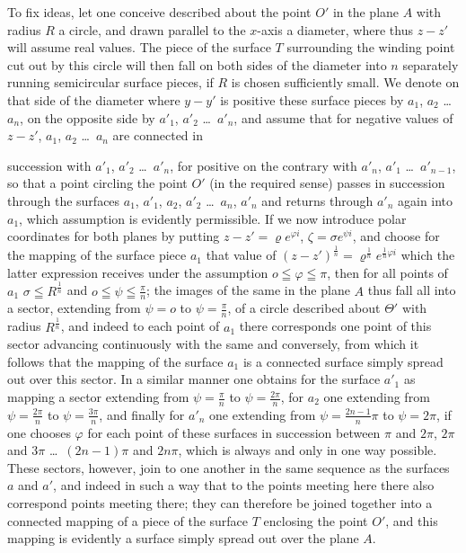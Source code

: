 \documentclass{article}
\begin{document}
To fix ideas, let one conceive described about the point $O'$ in the plane $A$ with radius $R$ a circle, and drawn parallel to the $x$-axis a diameter, where thus $z - z'$ will assume real values. The piece of the surface $T$ surrounding the winding point cut out by this circle will then fall on both sides of the diameter into $n$ separately running semicircular surface pieces, if $R$ is chosen sufficiently small. We denote on that side of the diameter where $y - y'$ is positive these surface pieces by $a_1$, $a_2$ \dots\ $a_n$, on the opposite side by $a'_1$, $a'_2$ \dots\ $a'_n$, and assume that for negative values of $z - z'$, $a_1$, $a_2$ \dots\ $a_n$ are connected in

succession with $a'_1$, $a'_2$ \dots\ $a'_n$, for positive on the contrary with $a'_n$, $a'_1$ \dots\ $a'_{n-1}$, so that a point circling the point $O'$ (in the required sense) passes in succession through the surfaces $a_1$, $a'_1$, $a_2$, $a'_2$ \dots\ $a_n$, $a'_n$ and returns through $a'_n$ again into $a_1$, which assumption is evidently permissible. If we now introduce polar coordinates for both planes by putting $z - z' = \varrho e^{\varphi i}$, $\zeta = \sigma e^{\psi i}$, and choose for the mapping of the surface piece $a_1$ that value of $(z - z')^{\frac{1}{n}} = \varrho^{\frac{1}{n}} e^{\frac{1}{n}\varphi i}$ which the latter expression receives under the assumption $o \leqq \varphi \leqq \pi$, then for all points of $a_1$ $\sigma \leqq R^{\frac{1}{n}}$ and $o \leqq \psi \leqq \frac{\pi}{n}$; the images of the same in the plane $A$ thus fall all into a sector, extending from $\psi = o$ to $\psi = \frac{\pi}{n}$, of a circle described about $\varTheta'$ with radius $R^{\frac{1}{n}}$, and indeed to each point of $a_1$ there corresponds one point of this sector advancing continuously with the same and conversely, from which it follows that the mapping of the surface $a_1$ is a connected surface simply spread out over this sector. In a similar manner one obtains for the surface $a'_1$ as mapping a sector extending from $\psi = \frac{\pi}{n}$ to $\psi = \frac{2\pi}{n}$, for $a_2$ one extending from $\psi = \frac{2\pi}{n}$ to $\psi = \frac{3\pi}{n}$, and finally for $a'_n$ one extending from $\psi = \frac{2n - 1}{n}\pi$ to $\psi = 2\pi$, if one chooses $\varphi$ for each point of these surfaces in succession between $\pi$ and $2\pi$, $2\pi$ and $3\pi$ \dots\ $(2n-1)\pi$ and $2n\pi$, which is always and only in one way possible. These sectors, however, join to one another in the same sequence as the surfaces $a$ and $a'$, and indeed in such a way that to the points meeting here there also correspond points meeting there; they can therefore be joined together into a connected mapping of a piece of the surface $T$ enclosing the point $O'$, and this mapping is evidently a surface simply spread out over the plane $A$.
\end{document}
